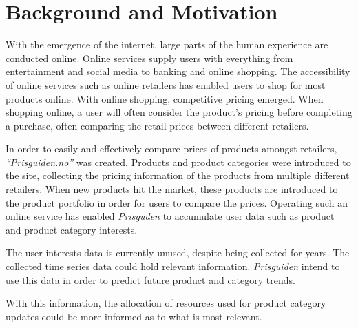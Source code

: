 \section{Background and Motivation}\label{cit}
\label{section:Introduction:BackgroundAndMotivation}

With the emergence of the internet, large parts of the human experience are conducted online.
Online services supply users with everything from entertainment and social media to banking and online shopping.
The accessibility of online services such as online retailers has enabled users to shop for most products online.
With online shopping, competitive pricing emerged.
When shopping online, a user will often consider the product's pricing before completing a purchase, often comparing the retail prices between different retailers.


In order to easily and effectively compare prices of products amongst retailers,
\textit{``Prisguiden.no''} was created.
Products and product categories were introduced to the site, collecting the pricing information of the products from multiple different retailers.
When new products hit the market, these products are introduced to the product portfolio in order for users to compare the prices.
Operating such an online service has enabled \textit{Prisguden} to accumulate user data such as product and product category interests.

The user interests data is currently unused, despite being collected for years.
The collected time series data could hold relevant information.
\textit{Prisguiden} intend to use this data in order to predict future product and category trends.

With this information, the allocation of resources used for product category updates could be more informed
as to what is most relevant.



